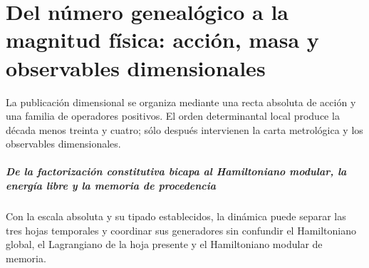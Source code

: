\chapter{Del número genealógico a la magnitud física: acción, masa y observables dimensionales}
\label{chap:parte-iv-49}

La publicación dimensional se organiza mediante una recta absoluta de acción y una familia de operadores positivos. El orden determinantal local produce la década menos treinta y cuatro; sólo después intervienen la carta metrológica y los observables dimensionales.

\begin{HMTScientificOwnerSubordinated}

\end{HMTScientificOwnerSubordinated}

\begin{HMTScientificOwnerSubordinated}

\end{HMTScientificOwnerSubordinated}



\paragraph{De la factorización constitutiva bicapa al Hamiltoniano modular, la energía libre y la memoria de procedencia} Con la escala absoluta y su tipado establecidos, la dinámica puede separar las tres hojas temporales y coordinar sus generadores sin confundir el Hamiltoniano global, el Lagrangiano de la hoja presente y el Hamiltoniano modular de memoria.

